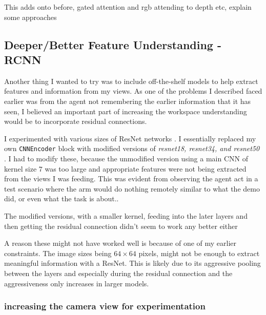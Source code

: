 This adds onto before, gated attention and rgb attending to depth etc, explain some approaches

\subsection{Deeper/Better Feature Understanding - RCNN}
Another thing I wanted to try was to include off-the-shelf models to help extract features and information from my views. As one of the problems I described faced earlier was from the agent not remembering the earlier information that it has seen, I believed an important part of increasing the workspace understanding would be to incorporate residual connections.

I experimented with various sizes of ResNet networks . I essentially replaced my own \verb|CNNEncoder| block with modified versions of \emph{resnet18, resnet34, and resnet50} . I had to modify these, because the unmodified version using a main CNN of kernel size $7$ was too large and appropriate features were not being extracted from the views I was feeding. This was evident from observing the agent act in a test scenario where the arm would do nothing remotely similar to what the demo did, or even what the task is about.. 

The modified versions, with a smaller kernel, feeding into the later layers and then getting the residual connection didn't seem to work any better either 

A reason these might not have worked well is because of one of my earlier constraints. The image sizes being \(64 \times 64\) pixels, might not be enough to extract meaningful information with a ResNet. This is likely due to its aggressive pooling between the layers and especially during the residual connection and the aggressiveness only increases in larger models.  

\subsubsection{increasing the camera view for experimentation}

